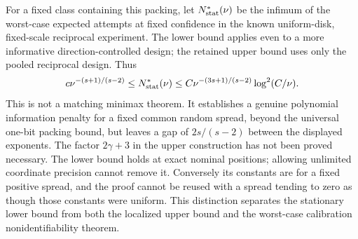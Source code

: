 For a fixed class containing this packing, let $N^*_{\rm stat}(\nu)$
be the infimum of the worst-case expected attempts at fixed confidence
in the known uniform-disk, fixed-scale reciprocal experiment. The lower
bound applies even to a more informative direction-controlled design;
the retained upper bound uses only the pooled reciprocal design. Thus
\begin{equation}\label{eq:stationary-bracket}
 c\nu^{-(s+1)/(s-2)}
       \le N^*_{\rm stat}(\nu)
       \le C\nu^{-(3s+1)/(s-2)}\log^2(C/\nu).
\end{equation}
This is not a matching minimax theorem. It establishes a genuine
polynomial information penalty for a fixed common random spread,
beyond the universal one-bit packing bound, but leaves a gap of
$2s/(s-2)$ between the displayed exponents. The factor $2\gamma+3$
in the upper construction has not been proved necessary. The lower
bound holds at exact nominal positions; allowing unlimited coordinate
precision cannot remove it. Conversely its constants are for a fixed
positive spread, and the proof cannot be reused with a spread tending
to zero as though those constants were uniform. This distinction
separates the stationary lower bound from both the localized upper
bound and the worst-case calibration nonidentifiability theorem.
